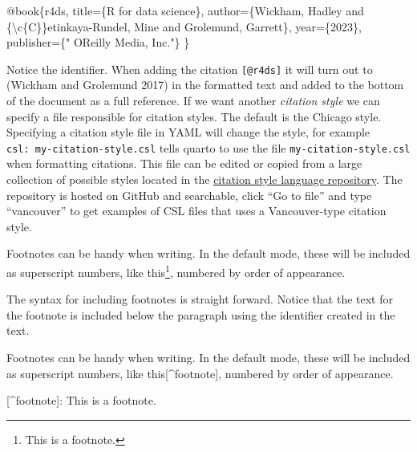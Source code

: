 \documentclass[
  11pt,
  letterpaper,
]{scrbook}
\newenvironment{Shaded}{\begin{snugshade}}{\end{snugshade}}
\newcommand{\ControlFlowTok}[1]{\textcolor[rgb]{0.00,0.23,0.31}{#1}}
\newcommand{\DecValTok}[1]{\textcolor[rgb]{0.68,0.00,0.00}{#1}}
\newcommand{\NormalTok}[1]{\textcolor[rgb]{0.00,0.23,0.31}{#1}}
\newcommand{\OtherTok}[1]{\textcolor[rgb]{0.00,0.23,0.31}{#1}}
\newcommand{\SpecialCharTok}[1]{\textcolor[rgb]{0.37,0.37,0.37}{#1}}
\newcommand{\StringTok}[1]{\textcolor[rgb]{0.13,0.47,0.30}{#1}}
\begin{document}
\begin{Shaded}
\begin{Highlighting}[numbers=left,,]
\SpecialCharTok{@}\NormalTok{book\{r4ds,}
\NormalTok{  title}\OtherTok{=}\NormalTok{\{R }\ControlFlowTok{for}\NormalTok{ data science\},}
\NormalTok{  author}\OtherTok{=}\NormalTok{\{Wickham, Hadley and \{\textbackslash{}c\{C\}\}etinkaya}\SpecialCharTok{{-}}\NormalTok{Rundel, Mine and Grolemund, Garrett\},}
\NormalTok{  year}\OtherTok{=}\NormalTok{\{}\DecValTok{2023}\NormalTok{\},}
\NormalTok{  publisher}\OtherTok{=}\NormalTok{\{}\StringTok{" O\textquotesingle{}Reilly Media, Inc."}\NormalTok{\}}
\NormalTok{\}}
\end{Highlighting}
\end{Shaded}

Notice the identifier. When adding the citation \texttt{{[}@r4ds{]}} it
will turn out to (Wickham and Grolemund 2017) in the formatted text and
added to the bottom of the document as a full reference. If we want
another \emph{citation style} we can specify a file responsible for
citation styles. The default is the Chicago style. Specifying a citation
style file in YAML will change the style, for example
\texttt{csl:\ my-citation-style.csl} tells quarto to use the file
\texttt{my-citation-style.csl} when formatting citations. This file can
be edited or copied from a large collection of possible styles located
in the \href{https://github.com/citation-style-language/styles}{citation
style language repository}. The repository is hosted on GitHub and
searchable, click ``Go to file'' and type ``vancouver'' to get examples
of CSL files that uses a Vancouver-type citation style.

Footnotes can be handy when writing. In the default mode, these will be
included as superscript numbers, like this\footnote{This is a footnote.},
numbered by order of appearance.

The syntax for including footnotes is straight forward. Notice that the
text for the footnote is included below the paragraph using the
identifier created in the text.

\begin{Shaded}
\begin{Highlighting}[numbers=left,,]
\NormalTok{Footnotes can be handy when writing. In the default mode, }
\NormalTok{these will be included as superscript numbers, like }
\NormalTok{this[}\SpecialCharTok{\^{}}\NormalTok{footnote], numbered by order of appearance. }

\NormalTok{[}\SpecialCharTok{\^{}}\NormalTok{footnote]}\SpecialCharTok{:}\NormalTok{ This is a footnote.}
\end{Highlighting}
\end{Shaded}
\end{document}
